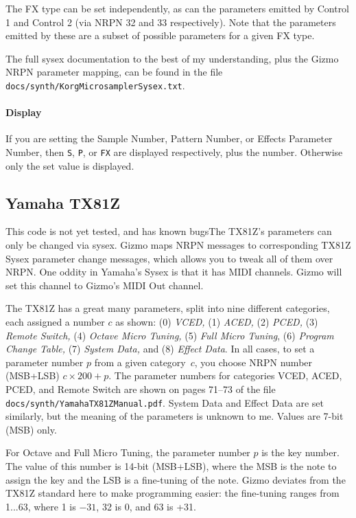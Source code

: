 \documentclass{article}
\begin{document}
The FX type can be set independently, as can the parameters emitted by Control 1 and Control 2 (via NRPN 32 and 33 respectively).  Note that the parameters emitted by these are a subset of possible parameters for a given FX type.

The full sysex documentation to the best of my understanding, plus the Gizmo NRPN parameter mapping, can be found in the file \texttt{docs/synth/KorgMicrosamplerSysex.txt}.


\paragraph{Display} If you are setting the Sample Number, Pattern Number, or Effects Parameter Number, then \texttt{S}, \texttt{P}, or \texttt{FX} are displayed respectively, plus the number.  Otherwise only the set value is displayed.

\subsection{Yamaha TX81Z} {\color{red} This code is not yet tested, and has known bugs}\quad The TX81Z's parameters can only be changed via sysex.  Gizmo maps NRPN messages to corresponding TX81Z Sysex parameter change messages, which allows you to tweak all of them over NRPN.   One oddity in Yamaha's Sysex is that it has MIDI channels.  Gizmo will set this channel to Gizmo's MIDI Out channel.

The TX81Z has a great many parameters, split into nine different categories, each assigned a number \(c\) as shown:  (0) {\it VCED,} (1) {\it ACED,} (2) {\it PCED,}  (3) {\it Remote Switch,}  (4) {\it Octave Micro Tuning,} (5) {\it Full Micro Tuning},  (6) {\it Program Change Table,} (7) {\it System Data,} and (8) {\it Effect Data}.  In all cases, to set a parameter number \(p\) from a given category~\(c\), you choose NRPN number (MSB+LSB) \(c \times 200 + p\). The parameter numbers for categories VCED, ACED, PCED, and Remote Switch are shown on pages 71--73 of the file \texttt{docs/synth/YamahaTX81ZManual.pdf}.   System Data and Effect Data are set similarly, but the meaning of the parameters is unknown to me.  Values are 7-bit (MSB) only.

For Octave and Full Micro Tuning, the parameter number \(p\) is the key number.  The value of this number is 14-bit (MSB+LSB), where the MSB is the note to assign the key and the LSB is a fine-tuning of the note.  Gizmo deviates from the TX81Z standard here to make programming easier: the fine-tuning ranges from 1...63, where 1 is \(-31\), 32 is 0, and 63 is +31.
\end{document}
